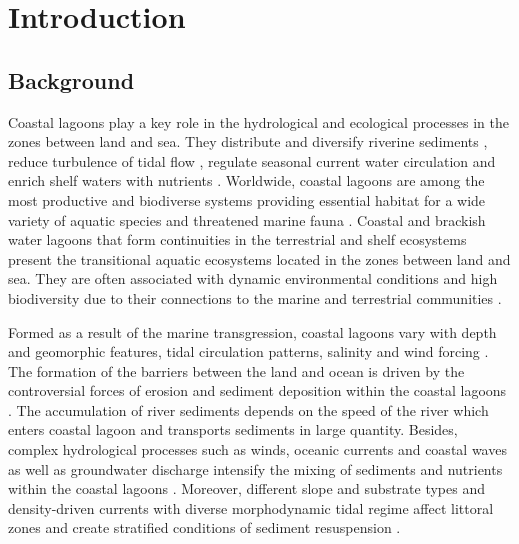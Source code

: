 \documentclass[jmse,article,submit,pdftex,moreauthors]{Definitions/mdpi}
\begin{document}
\section{Introduction}

\subsection{Background}

Coastal lagoons play a key role in the hydrological and ecological processes in the zones between land and sea. They distribute and diversify riverine sediments \cite{AMARAL2023165264}, reduce turbulence of tidal flow \cite{XUE2023103048}, regulate seasonal current water circulation \cite{MAO2023102276} and enrich shelf waters with nutrients \cite{CEBRIAN20099}. Worldwide, coastal lagoons are among the most productive and biodiverse systems providing essential habitat for a wide variety of aquatic species and threatened marine fauna \cite{MATEOSMOLINA2024116117,ZAMORALOPEZ2023108447,MIGNUCCI2023108450}. Coastal and brackish water lagoons that form continuities in the terrestrial and shelf ecosystems present the transitional aquatic ecosystems located in the zones between land and sea. They are often associated with dynamic environmental conditions and high biodiversity due to their connections to the marine and terrestrial communities \cite{PEREZRUZAFA2019253}. 

Formed as a result of the marine transgression, coastal lagoons vary with depth and geomorphic features, tidal circulation patterns, salinity and wind forcing \cite{KJERFVE198663}. The formation of the barriers between the land and ocean is driven by the controversial forces of erosion and sediment deposition within the coastal lagoons \cite{BOYD1992139}. The accumulation of river sediments depends on the speed of the river which enters coastal lagoon and transports sediments in large quantity. Besides, complex hydrological processes such as winds, oceanic currents and coastal waves as well as groundwater discharge \cite{DANISH2020103816} intensify the mixing of sediments and nutrients within the coastal lagoons \cite{KUMAR2016155}. Moreover, different slope and substrate types and density-driven currents with diverse morphodynamic tidal regime affect littoral zones and create stratified conditions of sediment resuspension \cite{BORTOLIN2020105782,Larson2012}. 
\end{document}
